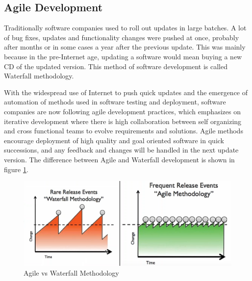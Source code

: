 \documentclass[9pt,twocolumn,twoside]{../../styles/osajnl}
\begin{document}
\subsection{Agile Development}
Traditionally software companies used to roll out updates in large batches. A lot of bug fixes, updates and functionality changes were pushed at once, probably after months or in some cases a year after the previous update. This was mainly because in the pre-Internet age, updating a software would mean buying a new CD of the updated version. This method of software development is called Waterfall methodology.

With the widespread use of Internet to push quick updates and the emergence of automation of methods used in software testing and deployment, software companies are now following agile development practices, which emphasizes on iterative development where there is high collaboration between self organizing and cross functional teams to evolve requirements and solutions. Agile methods encourage deployment of high quality and goal oriented software in quick successions, and any feedback and changes will be handled in the next update version. The difference between Agile and Waterfall development is shown in figure \ref{fig:agile}.

\begin{figure}[htbp]
\centering
\includegraphics[width=\linewidth]{images/agile.png}
\caption{Agile vs Waterfall Methodology \cite{www-youtube-cf}}
\label{fig:agile}
\end{figure}

\end{document}
